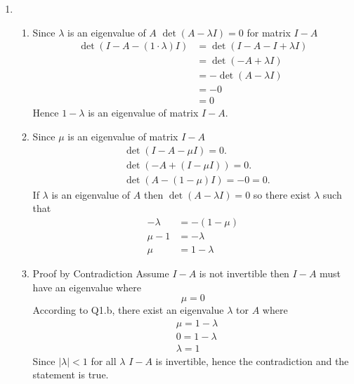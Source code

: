 \documentclass[11pt]{article}
\begin{document}
	\begin{enumerate}[{\bf Q1.}]	
		\item
		\begin{enumerate}
			\item 
			Since $\lambda$ is an eigenvalue of $A$
			$\operatorname{det}(A-\lambda I)=0$ for matrix $I-A$
			$$
			\begin{aligned}
			\operatorname{det}(I-A-(1 \cdot \lambda) I) & =\operatorname{det}(I-A-I+\lambda I) \\
			& =\operatorname{det}(-A+\lambda I) \\
			& =-\operatorname{det}(A-\lambda I) \\
			& =-0 \\
			& =0
			\end{aligned}
			$$
			Hence $1-\lambda$ is an eigenvalue of matrix $I-A$.
			\item 
			Since $\mu$ is an eigenvalue of matrix $I-A$
			$$
			\begin{aligned}
			& \operatorname{det}(I-A-\mu I)=0 . \\
			& \operatorname{det}(-A+(I-\mu I))=0 . \\
			& \operatorname{det}(A-(1-\mu) I)=-0=0 .
			\end{aligned}
			$$
			If $\lambda$ is an eigenvalue of $A$ then $\operatorname{det}(A-\lambda I)=0$
			so there exist $\lambda$ such that
			$$
			\begin{aligned}
			-\lambda & =-(1-\mu) \\
			\mu-1 & =-\lambda \\
			\mu & =1-\lambda
			\end{aligned}
			$$

			\item
			Proof by Contradiction \newline
			Assume $I-A$ is not invertible then $I-A$ must have an eigenvalue where
			$$
			\mu=0
			$$
			According to Q1.b, there exist an eigenvalue $\lambda$ tor $A$ where
			$$
			\begin{aligned}
			& \mu=1-\lambda \\
			& 0=1-\lambda \\
			& \lambda=1
			\end{aligned}
			$$
			Since $|\lambda|<1$ for all $\lambda$ \newline
			$I-A$ is invertible, hence the contradiction and the statement is true. 

		\end{enumerate}
		

\end{enumerate}
\end{document}
